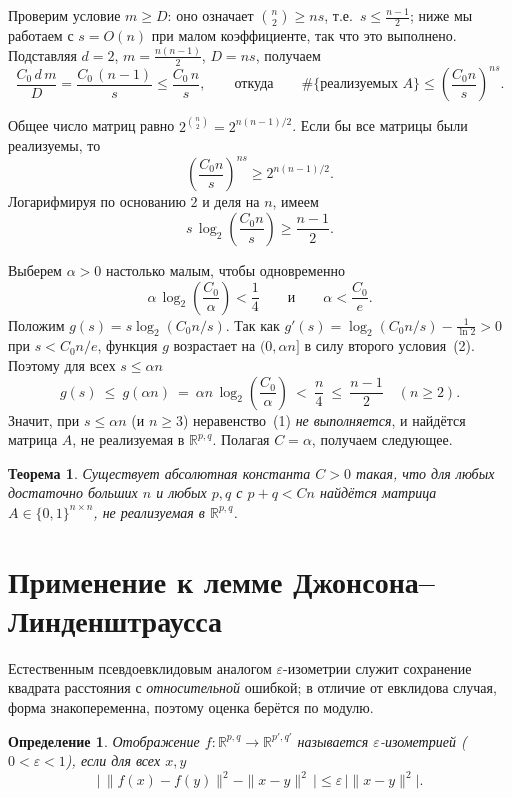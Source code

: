\documentclass[12pt]{article}
\newtheorem{theorem}{Теорема}
\newtheorem{definition}{Определение}
\newcommand{\R}{\mathbb{R}}
\begin{document}
Проверим условие \(m\ge D\): оно означает \(\binom n2 \ge ns\), т.е.\ \(s \le \tfrac{n-1}{2}\); ниже мы работаем с \(s=O(n)\) при малом коэффициенте, так что это выполнено. Подставляя \(d=2\), \(m=\tfrac{n(n-1)}2\), \(D=ns\), получаем
\[
\frac{C_0\, d\, m}{D} = \frac{C_0\,(n-1)}{s} \le \frac{C_0\, n}{s},
\qquad\text{откуда}\qquad
\#\{\text{реализуемых } A\} \le \left(\frac{C_0 n}{s}\right)^{n s}.
\]

Общее число матриц равно \(2^{\binom n2}=2^{n(n-1)/2}\). Если бы все матрицы были реализуемы, то
\[
\left(\frac{C_0 n}{s}\right)^{n s} \ge 2^{n(n-1)/2}.
\]
Логарифмируя по основанию \(2\) и деля на \(n\), имеем
\[
s\,\log_2\!\left(\frac{C_0 n}{s}\right) \ge \frac{n-1}{2}. \tag{1}
\]

Выберем \(\alpha>0\) настолько малым, чтобы одновременно
\[
\alpha\,\log_2\!\left(\frac{C_0}{\alpha}\right) < \frac14
\qquad\text{и}\qquad
\alpha < \frac{C_0}{e}. \tag{2}
\]
Положим \(g(s) = s\log_2(C_0 n/s)\). Так как \(g'(s)=\log_2(C_0 n/s)-\tfrac1{\ln 2}>0\) при \(s<C_0 n/e\), функция \(g\) возрастает на \((0,\alpha n]\) в силу второго условия~(2). Поэтому для всех \(s\le \alpha n\)
\[
g(s)\ \le\ g(\alpha n)\ =\ \alpha n\,\log_2\!\left(\frac{C_0}{\alpha}\right)\ <\ \frac n4\ \le\ \frac{n-1}{2}\quad(n\ge 2).
\]
Значит, при \(s\le\alpha n\) (и \(n\ge 3\)) неравенство~(1) \emph{не выполняется}, и найдётся матрица \(A\), не реализуемая в \(\R^{p,q}\). Полагая \(C=\alpha\), получаем следующее.

\begin{theorem}\label{thm:counting}
Существует абсолютная константа \(C>0\) такая, что для любых достаточно больших \(n\) и любых \(p,q\) с \(p+q < C n\) найдётся матрица \(A\in\{0,1\}^{n\times n}\), не реализуемая в \(\R^{p,q}\).
\end{theorem}

\section{Применение к лемме Джонсона--Линденштраусса}

Естественным псевдоевклидовым аналогом \(\varepsilon\)-изометрии служит сохранение квадрата расстояния с \emph{относительной} ошибкой; в отличие от евклидова случая, форма знакопеременна, поэтому оценка берётся по модулю.

\begin{definition}
Отображение \(f:\R^{p,q}\to\R^{p',q'}\) называется \(\varepsilon\)-изометрией (\(0<\varepsilon<1\)), если для всех \(x,y\)
\[
\bigl|\,\|f(x)-f(y)\|^2 - \|x-y\|^2\,\bigr| \le \varepsilon\,\bigl|\|x-y\|^2\bigr|. \tag{3}
\]
\end{definition}
\end{document}
